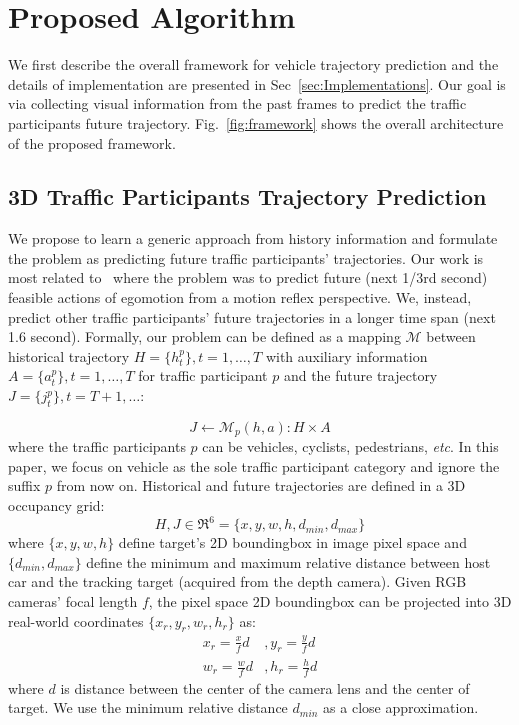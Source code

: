 \documentclass[10pt,twocolumn,letterpaper]{article}
\begin{document}
 \section{Proposed Algorithm}

We first describe the overall framework for vehicle trajectory prediction and the details of implementation are presented in Sec~\ref{sec:Implementations}.
Our goal is via collecting visual information from the past frames to predict the traffic participants future trajectory. Fig.~\ref{fig:framework} shows the overall architecture of the proposed framework.

\subsection{3D Traffic Participants Trajectory Prediction}

We propose to learn a generic approach from history information and formulate the problem as predicting future traffic participants' trajectories.
Our work is most related to~\cite{xu2017end} where the problem was to predict future (next 1/3rd second) feasible actions of egomotion from a motion reflex perspective.
We, instead,  predict other traffic participants' future trajectories in a longer time span (next 1.6 second).
Formally, our problem can be defined as a mapping $\mathcal{M}$ between historical trajectory $H=\{h_t^p\}, t=1,\dots, T $ with auxiliary information $ A=\{a_t^p\}, t=1,\dots, T $ for traffic participant $p$ and the future trajectory $J=\{j_t^p\}, t={T+1}, \ldots$:

\begin{equation}
J \leftarrow \bm{\mathcal{M}}_p(h, a): H \times A
\label{eq:mapping}
\end{equation}
where the traffic participants $p$ can be vehicles, cyclists, pedestrians, \emph{etc}. In this paper, we focus on vehicle as the sole traffic participant category and ignore the suffix $p$ from now on. Historical and future trajectories are defined in a 3D occupancy grid:
\begin{equation}
H, J \in \Re^{6} =  \{x, y, w, h, d_{min}, d_{max}\}
\label{eq:mapping2}
\end{equation}
where $\{x,y,w,h\}$ define target's 2D boundingbox in image pixel space and $\{d_{min}, d_{max}\}$ define the minimum and maximum relative distance between host car and the tracking target (acquired from the depth camera). Given RGB cameras' focal length $f$, the pixel space 2D boundingbox can be projected into 3D real-world coordinates $\{x_r,y_r,w_r,h_r\}$ as:
\begin{align}
    x_r = \frac{x}{f}d &, y_r = \frac{y}{f} d  \label{eq:focal_length_1}  \\
    w_r = \frac{w}{f}d &, h_r = \frac{h}{f} d
    \label{eq:focal_length_2}
\end{align}
where $d$ is distance between  the center of the camera lens and the center of target. We use the minimum relative distance $d_{min}$ as a close approximation.
\end{document}
